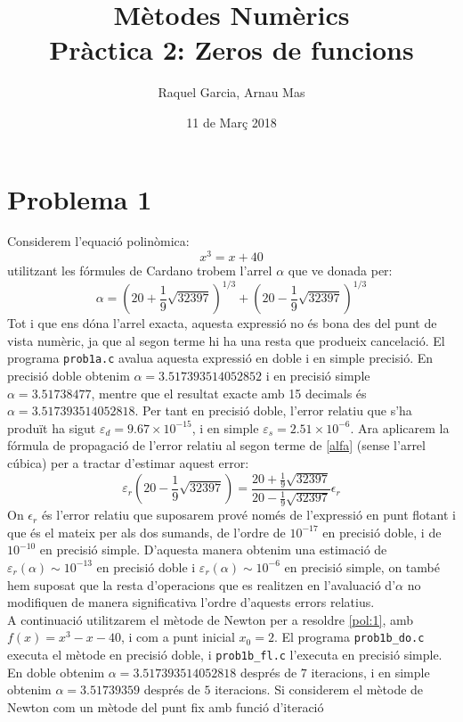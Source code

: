 \documentclass[12pt]{article}
\title{\textsf{\textbf{Mètodes Numèrics \\ Pràctica 2:} Zeros de funcions}}
\author{\textsf{Raquel Garcia, Arnau Mas}}
\date{\textsf{11 de Març 2018}}
\begin{document}
	\maketitle
	\section*{Problema 1}
	
	Considerem l'equació polinòmica:
	\begin{equation}\label{pol:1}
		x^3=x+40
	\end{equation}
	utilitzant les fórmules de Cardano trobem l'arrel $\alpha$ que ve donada per:
	\begin{equation}\label{alfa}
		\alpha=\left(20+\frac{1}{9}\sqrt{32397} \right)^{1/3}+\left(20-\frac{1}{9}\sqrt{32397} \right)^{1/3}
	\end{equation}
	Tot i que ens dóna l'arrel exacta, aquesta expressió no és bona des del punt de vista numèric, ja que al segon terme hi ha una resta que produeix cancelació. El programa \texttt{prob1a.c} avalua aquesta expressió en doble i en simple precisió. En precisió doble obtenim $\alpha=3.517393514052852$ i en precisió simple $\alpha=3.51738477$, mentre que el resultat exacte amb 15 decimals és $\alpha=3.517393514052818$. Per tant en precisió doble, l'error relatiu que s'ha produït ha sigut $\varepsilon_d=9.67\times10^{-15}$, i en simple $\varepsilon_s=2.51\times10^{-6}$. Ara aplicarem la fórmula de propagació de l'error relatiu al segon terme de \eqref{alfa} (sense l'arrel cúbica) per a tractar d'estimar aquest error:
	\begin{equation}\label{errorrelatiu1}
		\varepsilon_r\left( 20-\frac{1}{9}\sqrt{32397}\right) =\dfrac{20+\frac{1}{9}\sqrt{32397}}{ 20-\frac{1}{9}\sqrt{32397}}\epsilon_r
	\end{equation}
	On $\epsilon_r$ és l'error relatiu que suposarem prové només de l'expressió en punt flotant i que és el mateix per als dos sumands, de l'ordre de $10^{-17}$ en precisió doble, i de $10^{-10}$ en precisió simple. D'aquesta manera obtenim una estimació de $\varepsilon_r(\alpha)\sim10^{-13}$ en precisió doble  i $\varepsilon_r(\alpha)\sim10^{-6}$ en precisió simple, on també hem suposat que la resta d'operacions que es realitzen en l'avaluació d'$\alpha$ no modifiquen de manera significativa l'ordre d'aquests errors relatius.\\
	
	
	A continuació utilitzarem el mètode de Newton per a resoldre \eqref{pol:1}, amb $f(x)=x^3-x-40$, i com a punt inicial $x_0=2$. El programa \texttt{prob1b\_do.c} executa el mètode en precisió doble, i \texttt{prob1b\_fl.c} l'executa en precisió simple. En doble obtenim $\alpha=3.517393514052818$ després de $7$ iteracions, i en simple obtenim $\alpha=3.51739359$ després de $5$ iteracions. Si considerem el mètode de Newton com un mètode del punt fix amb funció d'iteració
	
\end{document}
